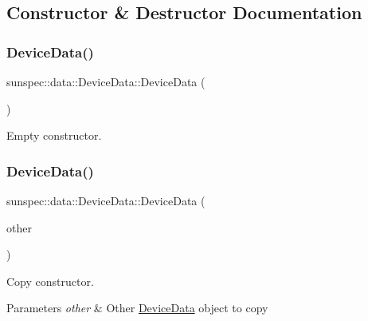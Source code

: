 \subsection{Constructor \& Destructor Documentation}
\mbox{\label{structsunspec_1_1data_1_1_device_data_a967eadc9b8a8be0b768d6a68ff7f38ea}} 
\subsubsection{\texorpdfstring{Device\+Data()}{DeviceData()}\hspace{0.1cm}{\footnotesize\ttfamily [1/2]}}
{\footnotesize\ttfamily sunspec\+::data\+::\+Device\+Data\+::\+Device\+Data (\begin{DoxyParamCaption}{ }\end{DoxyParamCaption})\hspace{0.3cm}{\ttfamily [default]}}

Empty constructor. \mbox{\label{structsunspec_1_1data_1_1_device_data_a652eacfb6981db9e705131bfcbdfdc4b}} 
\subsubsection{\texorpdfstring{Device\+Data()}{DeviceData()}\hspace{0.1cm}{\footnotesize\ttfamily [2/2]}}
{\footnotesize\ttfamily sunspec\+::data\+::\+Device\+Data\+::\+Device\+Data (\begin{DoxyParamCaption}\item[{const \hyperlink{structsunspec_1_1data_1_1_device_data}{Device\+Data} \&}]{other }\end{DoxyParamCaption})\hspace{0.3cm}{\ttfamily [default]}}

Copy constructor. 
\begin{DoxyParams}{Parameters}
{\em other} & Other {\ttfamily \hyperlink{structsunspec_1_1data_1_1_device_data}{Device\+Data}} object to copy \\
\hline
\end{DoxyParams}


